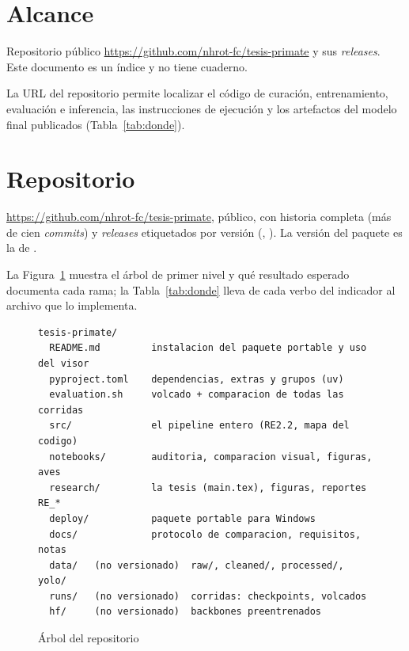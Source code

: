 \documentclass[12pt,a4paper]{article}
\begin{document}

\section{Alcance}

 Repositorio público
\url{https://github.com/nhrot-fc/tesis-primate} y sus \emph{releases}. Este documento es un
índice y no tiene cuaderno.

 La URL del repositorio permite localizar el código de curación,
entrenamiento, evaluación e inferencia, las instrucciones de ejecución y los artefactos del
modelo final publicados (Tabla~\ref{tab:donde}).

\section{Repositorio}

 \url{https://github.com/nhrot-fc/tesis-primate}, público, con historia completa
(más de cien \emph{commits}) y \emph{releases} etiquetados por versión
(, ). La versión del paquete es la de .

 La Figura~\ref{fig:arbol} muestra el árbol de primer nivel y qué
resultado esperado documenta cada rama; la Tabla~\ref{tab:donde} lleva de cada verbo del
indicador al archivo que lo implementa.

\begin{figure}[htbp]
    \centering
    \begin{minipage}{0.92\textwidth}
\begin{lstlisting}
tesis-primate/
  README.md         instalacion del paquete portable y uso del visor
  pyproject.toml    dependencias, extras y grupos (uv)
  evaluation.sh     volcado + comparacion de todas las corridas
  src/              el pipeline entero (RE2.2, mapa del codigo)
  notebooks/        auditoria, comparacion visual, figuras, aves
  research/         la tesis (main.tex), figuras, reportes RE_*
  deploy/           paquete portable para Windows
  docs/             protocolo de comparacion, requisitos, notas
  data/   (no versionado)  raw/, cleaned/, processed/, yolo/
  runs/   (no versionado)  corridas: checkpoints, volcados
  hf/     (no versionado)  backbones preentrenados
\end{lstlisting}
    \end{minipage}
    \caption{Árbol del repositorio}
    \label{fig:arbol}
\end{figure}
\end{document}
